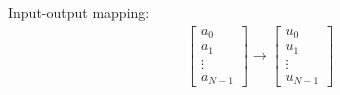 Input-output mapping:
\begin{align*}
    \begin{bmatrix}
        a_0 \\
        a_1 \\
        \vdots \\
        a_{N-1}
    \end{bmatrix}
    \to
    \begin{bmatrix}
        u_0 \\
        u_1 \\
        \vdots \\
        u_{N-1}
    \end{bmatrix}
\end{align*}







